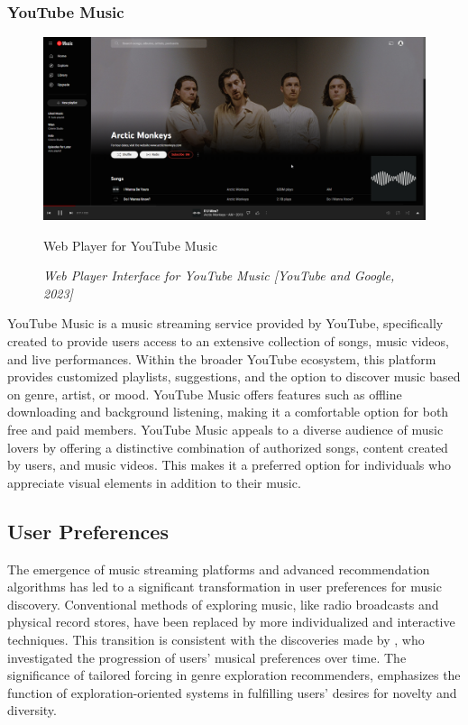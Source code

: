 \subsubsection{YouTube Music}
\begin{figure}[h]
    \centering
    \includegraphics[width=1.0\linewidth]{mainmatter/images/musicplat3.png}
    \caption{Web Player for YouTube Music}
    \caption*{\textit{Web Player Interface for YouTube Music [YouTube and Google, 2023]}}
    \label{fig:myfig8}
\end{figure}
YouTube Music is a music streaming service provided by YouTube, specifically created to provide users access to an extensive collection of songs, music videos, and live performances. Within the broader YouTube ecosystem, this platform provides customized playlists, suggestions, and the option to discover music based on genre, artist, or mood. YouTube Music offers features such as offline downloading and background listening, making it a comfortable option for both free and paid members. YouTube Music appeals to a diverse audience of music lovers by offering a distinctive combination of authorized songs, content created by users, and music videos. This makes it a preferred option for individuals who appreciate visual elements in addition to their music. \pagebreak

\subsection{User Preferences}
The emergence of music streaming platforms and advanced recommendation algorithms has led to a significant transformation in user preferences for music discovery. Conventional methods of exploring music, like radio broadcasts and physical record stores, have been replaced by more individualized and interactive techniques. This transition is consistent with the discoveries made by \textcite{liang22}, who investigated the progression of users' musical preferences over time. The significance of tailored forcing in genre exploration recommenders, emphasizes the function of exploration-oriented systems in fulfilling users' desires for novelty and diversity. \\

